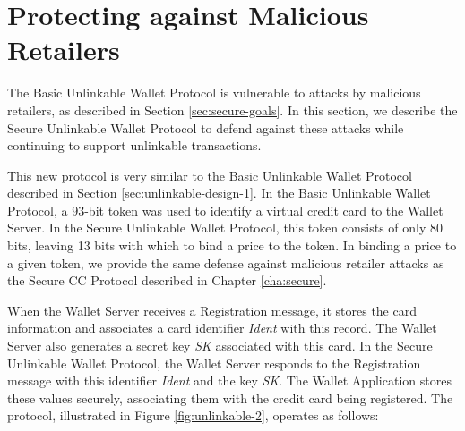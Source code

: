 \section{Protecting against Malicious Retailers}
\label{sec:unlinkable-design-2}

The Basic Unlinkable Wallet Protocol is vulnerable to attacks by malicious retailers, as described in Section \ref{sec:secure-goals}.
In this section, we describe the Secure Unlinkable Wallet Protocol to defend against these attacks while continuing to support unlinkable transactions.

This new protocol is very similar to the Basic Unlinkable Wallet Protocol described in Section \ref{sec:unlinkable-design-1}.
In the Basic Unlinkable Wallet Protocol, a 93-bit token was used to identify a virtual credit card to the Wallet Server.
In the Secure Unlinkable Wallet Protocol, this token consists of only 80 bits, leaving 13 bits with which to bind a price to the token.
In binding a price to a given token, we provide the same defense against malicious retailer attacks as the Secure CC Protocol described in Chapter \ref{cha:secure}.

When the Wallet Server receives a Registration message, it stores the card information and associates a card identifier \emph{Ident} with this record.
The Wallet Server also generates a secret key \emph{SK} associated with this card.
In the Secure Unlinkable Wallet Protocol, the Wallet Server responds to the Registration message with this identifier \emph{Ident} and the key \emph{SK}.
The Wallet Application stores these values securely, associating them with the credit card being registered.
The protocol, illustrated in Figure \ref{fig:unlinkable-2}, operates as follows:

